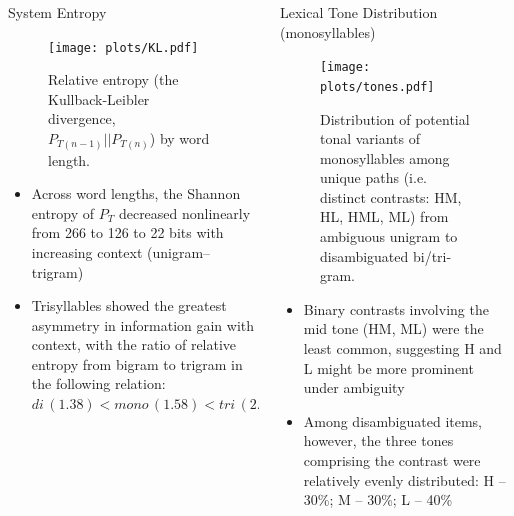 \documentclass[final]{beamer}
\begin{document}
\begin{frame}[t]
\begin{columns}[t]
\begin{column}{0.85\paperwidth}
\begin{columns}[t,totalwidth=0.85\paperwidth]
\begin{column}{0.4\paperwidth}
\begin{block}{System Entropy}

\begin{figure}
\texttt{[image: plots/KL.pdf]}
\caption{Relative entropy (the Kullback-Leibler divergence, $P_{T(n-1)}||P_{T(n)}$) by word length.}
\end{figure}

\begin{itemize}
  \item Across word lengths, the Shannon entropy of $P_T$ decreased nonlinearly from 266 to 126 to 22 bits with increasing context (unigram--trigram)
  \item Trisyllables showed the greatest asymmetry in information gain with context, with the ratio of relative entropy from bigram to trigram in the following relation: $di\, (1.38) < mono\, (1.58) < tri\, (2.11)$
\end{itemize}

\end{block}

\end{column} 

\begin{column}{0.4\paperwidth}
\vspace{-.6in}

\begin{block}{Lexical Tone Distribution (monosyllables)}
\begin{figure}
\texttt{[image: plots/tones.pdf]}
\caption{Distribution of potential tonal variants of monosyllables among unique paths (i.e. distinct contrasts: HM, HL, HML, ML) from ambiguous unigram to disambiguated bi/tri-gram. }
\end{figure}

\begin{itemize}
  \item Binary contrasts involving the mid tone (HM, ML) were the least common, suggesting H and L might be more prominent under ambiguity
  \item Among disambiguated items, however, the three tones comprising the contrast were relatively evenly distributed: H -- 30\%; M -- 30\%; L -- 40\%
\end{itemize}

\bigskip
\bigskip

\end{block}



\end{column}
\end{columns}
\end{column}
\end{columns}
\end{frame}
\end{document}
